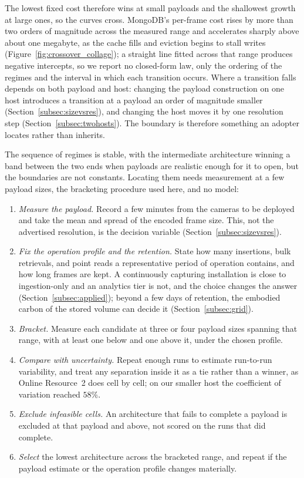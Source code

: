 \documentclass[pdflatex,sn-basic]{sn-jnl}%
\begin{document}
{\color{markup}The lowest fixed cost therefore wins at small payloads and the shallowest growth at large ones, so the curves cross.} {\color{markup}MongoDB's per-frame cost rises by more than two orders of magnitude across the measured range and accelerates sharply above about one megabyte, as the cache fills and eviction begins to stall writes~\citep{percona_wiredtiger_eviction} (Figure~\ref{fig:crossover_collage}); a straight line fitted across that range produces negative intercepts, so we report no closed-form law, only the ordering of the regimes and the interval in which each transition occurs.} {\color{markup}Where a transition falls depends on both payload and host: changing the payload construction on one host introduces a transition at a payload an order of magnitude smaller (Section~\ref{subsec:sizevsres}), and changing the host moves it by one resolution step (Section~\ref{subsec:twohosts}).} {\color{markup}The boundary is therefore something an adopter locates rather than inherits.}

{\color{markup}The sequence of regimes is stable, with the intermediate architecture winning a band between the two ends when payloads are realistic enough for it to open, but the boundaries are not constants.} {\color{markup}Locating them needs measurement at a few payload sizes, the bracketing procedure used here, and no model:}

\begin{enumerate}\setlength{\itemsep}{1pt}\setlength{\parskip}{0pt}
  \item \emph{Measure the payload.} Record a few minutes from the cameras to be deployed and take the mean and spread of the encoded frame size. This, not the advertised resolution, is the decision variable (Section~\ref{subsec:sizevsres}).
  \item {\color{markup}\emph{Fix the operation profile and the retention.} State how many insertions, bulk retrievals, and point reads a representative period of operation contains, and how long frames are kept.} {\color{markup}A continuously capturing installation is close to ingestion-only and an analytics tier is not, and the choice changes the answer (Section~\ref{subsec:applied}); beyond a few days of retention, the embodied carbon of the stored volume can decide it (Section~\ref{subsec:grid}).}
  \item \emph{Bracket.} Measure each candidate at three or four payload sizes spanning that range, with at least one below and one above it, under the chosen profile.
  \item {\color{markup}\emph{Compare with uncertainty.} Repeat enough runs to estimate run-to-run variability, and treat any separation inside it as a tie rather than a winner, as Online Resource~2 does cell by cell; on our smaller host the coefficient of variation reached $58\%$.}
  \item \emph{Exclude infeasible cells.} An architecture that fails to complete a payload is excluded at that payload and above, not scored on the runs that did complete.
  \item \emph{Select} the lowest architecture across the bracketed range, and repeat if the payload estimate or the operation profile changes materially.
\end{enumerate}
\end{document}
